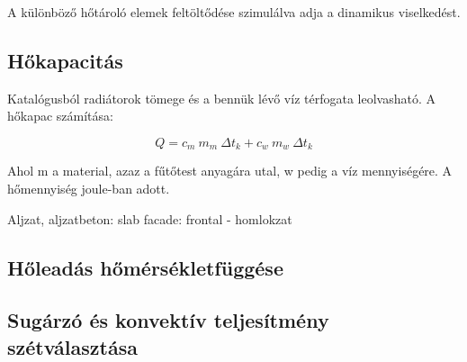 
A különböző hőtároló elemek feltöltődése szimulálva adja a dinamikus viselkedést.


\subsection{Hőkapacitás}

Katalógusból radiátorok tömege és a bennük lévő víz térfogata leolvasható. A hőkapac számítása:

\begin{equation} \label{eq_hotartalom}
Q = c_{m} ~ m_m ~ \Delta t_k + c_{w} ~ m_w ~ \Delta t_k
\end{equation}

Ahol m a material, azaz a fűtőtest anyagára utal, w pedig a víz mennyiségére. A hőmennyiség joule-ban adott.

Aljzat, aljzatbeton: slab
facade: frontal - homlokzat


\subsection{Hőleadás hőmérsékletfüggése}


\subsection{Sugárzó és konvektív teljesítmény szétválasztása}

